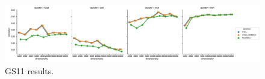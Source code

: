 \begin{figure}[t]
  \centering

    \includegraphics[width=\textwidth]{supplement/figures/gs11-results}
  \caption{GS11 results.}
  \label{fig:gs14-results}
\end{figure}


